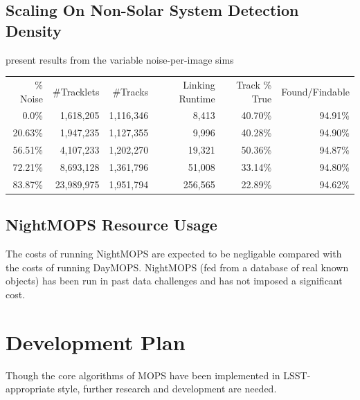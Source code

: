 \documentclass[12pt,preprint]{aastex}
\begin{document}
\subsection{Scaling On Non-Solar System Detection Density}

present results from the variable noise-per-image sims

\begin{tabular}{|r|r|r|r|r|r|}
  \hline 
  \% Noise & \#Tracklets & \#Tracks  & Linking Runtime & Track \% True & Found/Findable \\
  0.0\%    &  1,618,205  & 1,116,346 & 8,413           &  40.70\%      &  94.91\%       \\
  20.63\%  & 1,947,235   & 1,127,355 & 9,996           & 40.28\%       &  94.90\%       \\
  56.51\%  & 4,107,233   & 1,202,270 & 19,321          & 50.36\%       &  94.87\%       \\
  72.21\%  & 8,693,128   & 1,361,796 & 51,008          & 33.14\%       &  94.80\%       \\
  83.87\%  & 23,989,975  & 1,951,794 & 256,565         & 22.89\%       &  94.62\%       \\
  \hline
\end{tabular}



\subsection{NightMOPS Resource Usage}

The costs of running NightMOPS are expected to be negligable compared
with the costs of running DayMOPS.  NightMOPS (fed from a database of
real known objects) has been run in past data challenges and has not
imposed a significant cost. 















\section{Development Plan}

Though the core algorithms of MOPS have been implemented in
LSST-appropriate style, further research and development are needed.
\end{document}
